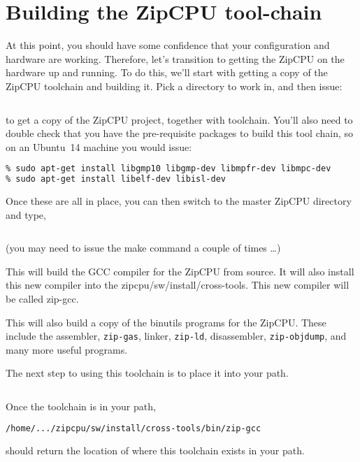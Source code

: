 \documentclass{gqtekspec}
\begin{document}
\section{Building the ZipCPU tool-chain}
At this point, you should have some confidence that your configuration and
hardware are working.  Therefore, let's transition to getting the ZipCPU
on the hardware up and running. 
To do this, we'll start with getting a copy
of the ZipCPU toolchain and building it.  Pick a directory to work in, and
then issue:
\begin{lstlisting}[language=bash]
% git clone https://github.com/ZipCPU/zipcpu
\end{lstlisting}
to get a copy of the ZipCPU project, together with toolchain.  You'll also
need to double check that you have the pre-requisite packages to build this
tool chain, so on an Ubuntu~14 machine you would issue:
\begin{lstlisting}[language=bash]
% sudo apt-get install flex bison libbison-dev
% sudo apt-get install libgmp10 libgmp-dev libmpfr-dev libmpc-dev
% sudo apt-get install libelf-dev libisl-dev
\end{lstlisting}
Once these are all in place, you can then switch to the master ZipCPU
directory and type,
\begin{lstlisting}[language=bash]
% cd zipcpu; make
\end{lstlisting}
(you may need to issue the make command a couple of times \ldots)

This will build the GCC compiler for the ZipCPU from source.  
It will also install this new compiler into the zipcpu/sw/install/cross-tools.
This new compiler will be called zip-gcc.

This will also build a copy of the binutils programs for the ZipCPU.  These
include the assembler, {\tt zip-gas}, linker, {\tt zip-ld}, disassembler,
{\tt zip-objdump}, and many more useful programs.

The next step to using this toolchain is to place it into your path.
\begin{lstlisting}[language=bash]
% export PATH=$PATH:$PWD/zipcpu/install/cross-tools/bin
\end{lstlisting}
Once the toolchain is in your path,
\begin{lstlisting}[language=bash]
% which zip-gcc
/home/.../zipcpu/sw/install/cross-tools/bin/zip-gcc
\end{lstlisting}
should return the location of where this toolchain exists in your path.
\end{document}
